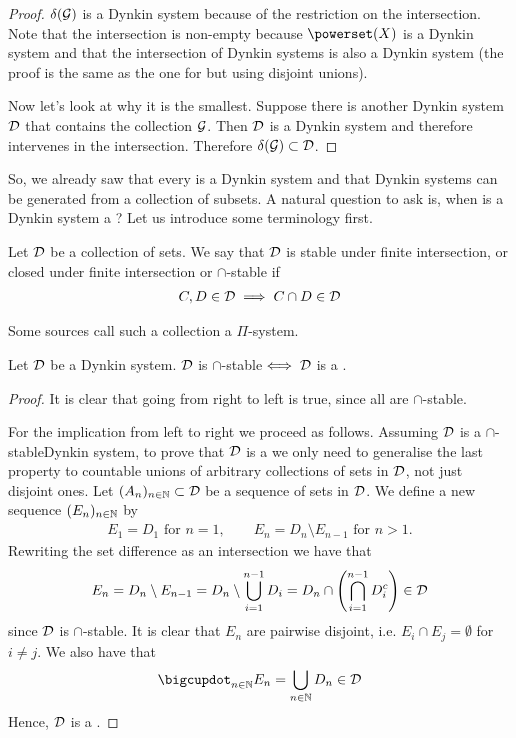 \begin{proof}
	$\delta(\mathcal{G})$ is a Dynkin system because of the restriction on the intersection. Note that the intersection is non-empty because $\powerset(X)$ is a Dynkin system and that the intersection of Dynkin systems is also a Dynkin system (the proof is the same as the one for \sigas but using disjoint unions).
	
	Now let's look at why it is the smallest. Suppose there is another Dynkin system $\mathcal{D}$ that contains the collection $\mathcal{G}$. Then $\mathcal{D}$ is a Dynkin system and therefore intervenes in the intersection. Therefore $\delta(\mathcal{G}) \subset \mathcal{D}$.
\end{proof}

So, we already saw that every \siga is a Dynkin system and that Dynkin systems can be generated from a collection of subsets. A natural question to ask is, when is a Dynkin system a \siga? Let us introduce some terminology first.

\newcommand{\istable}{$\cap$-stable}
\begin{dfn}
	Let $\mathcal{D}$ be a collection of sets. We say that $\mathcal{D}$ is stable under finite intersection, or closed under finite intersection or $\cap$-stable if
	\begin{align*}
	C, D \in \mathcal{D} \implies C \cap D \in \mathcal{D}
	\end{align*}
	
	Some sources call such a collection a $\Pi$-system.
\end{dfn}

\begin{lem}
	Let $\mathcal{D}$ be a Dynkin system. $\mathcal{D}$ is \istable $\iff \mathcal{D}$ is a \siga.
\end{lem}

\begin{proof}
	It is clear that going from right to left is true, since all \sigas are \istable.
	
	For the implication from left to right we proceed as follows. Assuming $\mathcal{D}$ is a \istable Dynkin system, to prove that $\mathcal{D}$ is a \siga we only need to generalise the last property to countable unions of arbitrary collections of sets in $\mathcal{D}$, not just disjoint ones. Let $(A_n)_{n\in\mathbb{N}} \subset \mathcal{D}$ be a sequence of sets in $\mathcal{D}$. We define a new sequence $(E_n)_{n\in\mathbb{N}}$ by
	\begin{align*}
	E_1 = D_1 \text{ for } n = 1,\qquad E_n = D_n \setminus E_{n-1} \text{ for } n > 1.
	\end{align*}
	Rewriting the set difference as an intersection we have that
	\begin{align*}
	E_n = D_n \setminus E_{n-1} = D_n \setminus \bigcup_{i=1}^{n-1}D_i = D_n \cap \left(\bigcap_{i=1}^{n-1} D_i^c\right) \in \mathcal{D}
	\end{align*}
	since $\mathcal{D}$ is \istable.
	It is clear that $E_n$ are pairwise disjoint, i.e. $E_i \cap E_j = \emptyset$ for $i \neq j$. We also have that
	\begin{align*}
	\bigcupdot_{n \in \N} E_n = \bigcup_{n \in \N} D_n \in \calD
	\end{align*}
	Hence, $\mathcal{D}$ is a \siga.
\end{proof}

